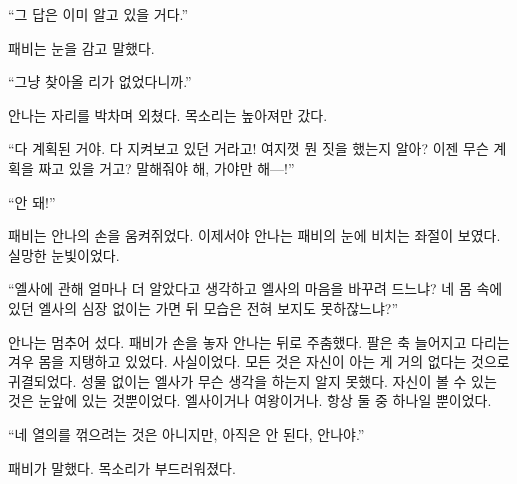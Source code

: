 ``그 답은 이미 알고 있을 거다.''

패비는 눈을 감고 말했다.

``그냥 찾아올 리가 없었다니까.''

안나는 자리를 박차며 외쳤다. 목소리는 높아져만 갔다.

``다 계획된 거야. 다 지켜보고 있던 거라고! 여지껏 뭔 짓을 했는지 알아? 이젠 무슨 계획을 짜고 있을 거고? 말해줘야 해, 가야만 해—!''

``안 돼!''

패비는 안나의 손을 움켜쥐었다. 이제서야 안나는 패비의 눈에 비치는 좌절이 보였다. 실망한 눈빛이었다.

``엘사에 관해 얼마나 더 알았다고 생각하고 엘사의 마음을 바꾸려 드느냐? 네 몸 속에 있던 엘사의 심장 없이는 가면 뒤 모습은 전혀 보지도 못하잖느냐?''

안나는 멈추어 섰다. 패비가 손을 놓자 안나는 뒤로 주춤했다. 팔은 축 늘어지고 다리는 겨우 몸을 지탱하고 있었다. 사실이었다. 모든 것은 자신이 아는 게 거의 없다는 것으로 귀결되었다. 성물 없이는 엘사가 무슨 생각을 하는지 알지 못했다. 자신이 볼 수 있는 것은 눈앞에 있는 것뿐이었다. 엘사이거나 여왕이거나. 항상 둘 중 하나일 뿐이었다.

``네 열의를 꺾으려는 것은 아니지만, 아직은 안 된다, 안나야.''

패비가 말했다. 목소리가 부드러워졌다.

